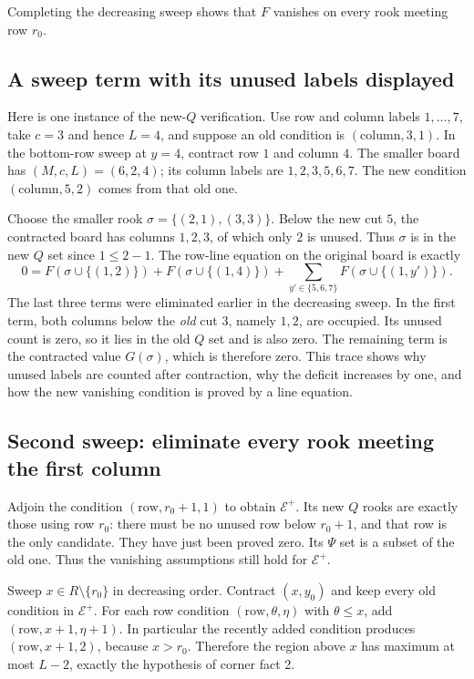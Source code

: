 \documentclass[11pt,a4paper,oneside,openany]{book}
\theoremstyle{definition}\newtheorem{definition}[theorem]{Definition}
\theoremstyle{remark}\newtheorem{remark}[theorem]{Remark}
\numberwithin{equation}{chapter}
\begin{document}
Completing the decreasing sweep shows that $F$ vanishes on every rook meeting row $r_0$.

\subsection{A sweep term with its unused labels displayed}
Here is one instance of the new-$Q$ verification. Use row and column
labels $1,\ldots,7$, take $c=3$ and hence $L=4$, and suppose an old
condition is $(\mathrm{column},3,1)$. In the bottom-row sweep at
$y=4$, contract row $1$ and column $4$. The smaller board has
$(M,c,L)=(6,2,4)$; its column labels are $1,2,3,5,6,7$.
The new condition $(\mathrm{column},5,2)$ comes from that old one.

Choose the smaller rook $\sigma=\{(2,1),(3,3)\}$. Below the new cut
$5$, the contracted board has columns $1,2,3$, of which only $2$
is unused. Thus $\sigma$ is in the new $Q$ set since $1\le2-1$.
The row-line equation on the original board is exactly
\[
 0=F(\sigma\cup\{(1,2)\})+F(\sigma\cup\{(1,4)\})
       +\sum_{y'\in\{5,6,7\}}F(\sigma\cup\{(1,y')\}).
\]
The last three terms were eliminated earlier in the decreasing sweep.
In the first term, both columns below the \emph{old} cut $3$, namely
$1,2$, are occupied. Its unused count is zero, so it lies in the old
$Q$ set and is also zero. The remaining term is the contracted value
$G(\sigma)$, which is therefore zero. This trace shows why unused
labels are counted after contraction, why the deficit increases by one,
and how the new vanishing condition is proved by a line equation.

\subsection{Second sweep: eliminate every rook meeting the first column}
Adjoin the condition $(\mathrm{row},r_0+1,1)$ to obtain $\mathcal E^+$. Its new $Q$ rooks are exactly those using row $r_0$: there must be no unused row below $r_0+1$, and that row is the only candidate. They have just been proved zero. Its $\Psi$ set is a subset of the old one. Thus the vanishing assumptions still hold for $\mathcal E^+$.

Sweep $x\in R\setminus\{r_0\}$ in decreasing order. Contract $(x,y_0)$ and keep every old condition in $\mathcal E^+$. For each row condition $(\mathrm{row},\theta,\eta)$ with $\theta\le x$, add $(\mathrm{row},x+1,\eta+1)$. In particular the recently added condition produces $(\mathrm{row},x+1,2)$, because $x>r_0$. Therefore the region above $x$ has maximum at most $L-2$, exactly the hypothesis of corner fact 2.
\end{document}

